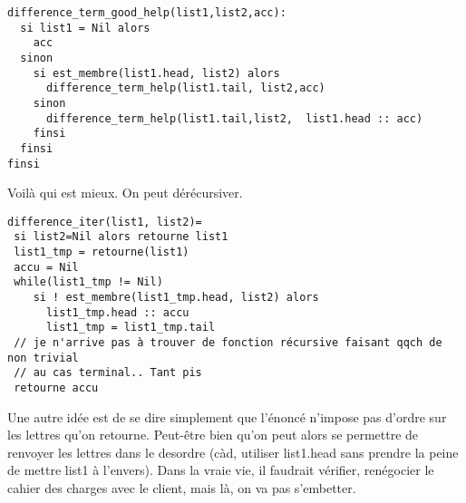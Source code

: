 \documentclass[10pt]{article}\usepackage[correction]{esial}
\begin{document}
\begin{Reponse}
\begin{Verbatim}[label=version terminale efficace]
difference_term_good_help(list1,list2,acc):
  si list1 = Nil alors
    acc
  sinon
    si est_membre(list1.head, list2) alors
      difference_term_help(list1.tail, list2,acc)
    sinon
      difference_term_help(list1.tail,list2,  list1.head :: acc)
    finsi
  finsi
finsi    
  \end{Verbatim}

  Voilà qui est mieux. On peut dérécursiver.

  \begin{Verbatim}[label=version terminale efficace]
difference_iter(list1, list2)=
 si list2=Nil alors retourne list1
 list1_tmp = retourne(list1)
 accu = Nil
 while(list1_tmp != Nil)
    si ! est_membre(list1_tmp.head, list2) alors
      list1_tmp.head :: accu
      list1_tmp = list1_tmp.tail
 // je n'arrive pas à trouver de fonction récursive faisant qqch de non trivial
 // au cas terminal.. Tant pis
 retourne accu
  \end{Verbatim}

  Une autre idée est de se dire simplement que l'énoncé n'impose pas d'ordre
  sur les lettres qu'on retourne. Peut-être bien qu'on peut alors se permettre
  de renvoyer les lettres dans le desordre (càd, utiliser list1.head sans
  prendre la peine de mettre list1 à l'envers). Dans la vraie vie, il faudrait
  vérifier, renégocier le cahier des charges avec le client, mais là, on va pas
  s'embetter.


\end{Reponse}
\end{document}

